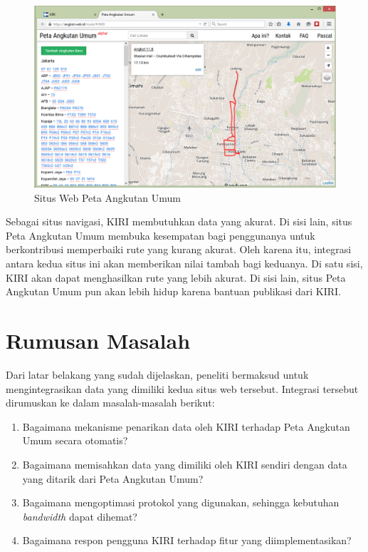 \begin{figure}
	\centering
	\includegraphics[scale=0.5]{Gambar/1_angkotwebid}
	\caption{Situs Web Peta Angkutan Umum}
	\label{fig:1_angkotwebid}
\end{figure}

Sebagai situs navigasi, KIRI membutuhkan data yang akurat. Di sisi lain, situs Peta Angkutan Umum membuka kesempatan bagi penggunanya untuk berkontribusi memperbaiki rute yang kurang akurat. Oleh karena itu, integrasi antara kedua situs ini akan memberikan nilai tambah bagi keduanya. Di satu sisi, KIRI akan dapat menghasilkan rute yang lebih akurat. Di sisi lain, situs Peta Angkutan Umum pun akan lebih hidup karena bantuan publikasi dari KIRI.

\section{Rumusan Masalah}

Dari latar belakang yang sudah dijelaskan, peneliti bermaksud untuk mengintegrasikan data yang dimiliki kedua situs web tersebut. Integrasi tersebut dirumuskan ke dalam masalah-masalah berikut:

\begin{enumerate}
	\item Bagaimana mekanisme penarikan data oleh KIRI terhadap Peta Angkutan Umum secara otomatis?
	\item Bagaimana memisahkan data yang dimiliki oleh KIRI sendiri dengan data yang ditarik dari Peta Angkutan Umum?
	\item Bagaimana mengoptimasi protokol yang digunakan, sehingga kebutuhan \textit{bandwidth} dapat dihemat?
	\item Bagaimana respon pengguna KIRI terhadap fitur yang diimplementasikan?
\end{enumerate}

